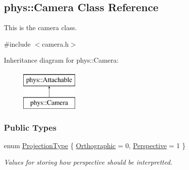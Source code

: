 \hypertarget{classphys_1_1Camera}{
\subsection{phys::Camera Class Reference}
\label{classphys_1_1Camera}
}


This is the camera class.  




{\ttfamily \#include $<$camera.h$>$}

Inheritance diagram for phys::Camera:\begin{figure}[H]
\begin{center}
\leavevmode
\includegraphics[height=2.000000cm]{classphys_1_1Camera}
\end{center}
\end{figure}
\subsubsection*{Public Types}
\begin{DoxyCompactItemize}
\item 
enum \hyperlink{classphys_1_1Camera_a87d8d46e9eb2080b10712079be69d86a}{ProjectionType} \{ \hyperlink{classphys_1_1Camera_a87d8d46e9eb2080b10712079be69d86aa6a71e6ab2139c8fc4d48d64aa9717f02}{Orthographic} =  0, 
\hyperlink{classphys_1_1Camera_a87d8d46e9eb2080b10712079be69d86aacfe21986c8c655b8d19ebd76118de055}{Perspective} =  1
 \}
\begin{DoxyCompactList}\small\item\em Values for storing how perspective should be interpretted. \item\end{DoxyCompactList}\end{DoxyCompactItemize}
